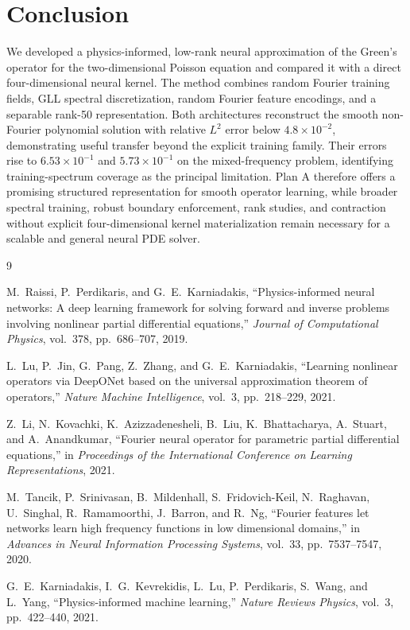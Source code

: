 \documentclass[11pt,a4paper]{article}
\begin{document}
\section{Conclusion}

We developed a physics-informed, low-rank neural approximation of the Green's operator for the two-dimensional Poisson equation and compared it with a direct four-dimensional neural kernel. The method combines random Fourier training fields, GLL spectral discretization, random Fourier feature encodings, and a separable rank-50 representation. Both architectures reconstruct the smooth non-Fourier polynomial solution with relative $L^2$ error below $4.8\times10^{-2}$, demonstrating useful transfer beyond the explicit training family. Their errors rise to $6.53\times10^{-1}$ and $5.73\times10^{-1}$ on the mixed-frequency problem, identifying training-spectrum coverage as the principal limitation. Plan A therefore offers a promising structured representation for smooth operator learning, while broader spectral training, robust boundary enforcement, rank studies, and contraction without explicit four-dimensional kernel materialization remain necessary for a scalable and general neural PDE solver.

\footnotesize
\begin{thebibliography}{9}

M.~Raissi, P.~Perdikaris, and G.~E.~Karniadakis,
``Physics-informed neural networks: A deep learning framework for solving forward and inverse problems involving nonlinear partial differential equations,''
\emph{Journal of Computational Physics}, vol.~378, pp.~686--707, 2019.

L.~Lu, P.~Jin, G.~Pang, Z.~Zhang, and G.~E.~Karniadakis,
``Learning nonlinear operators via DeepONet based on the universal approximation theorem of operators,''
\emph{Nature Machine Intelligence}, vol.~3, pp.~218--229, 2021.

Z.~Li, N.~Kovachki, K.~Azizzadenesheli, B.~Liu, K.~Bhattacharya, A.~Stuart, and A.~Anandkumar,
``Fourier neural operator for parametric partial differential equations,''
in \emph{Proceedings of the International Conference on Learning Representations}, 2021.

M.~Tancik, P.~Srinivasan, B.~Mildenhall, S.~Fridovich-Keil, N.~Raghavan, U.~Singhal, R.~Ramamoorthi, J.~Barron, and R.~Ng,
``Fourier features let networks learn high frequency functions in low dimensional domains,''
in \emph{Advances in Neural Information Processing Systems}, vol.~33, pp.~7537--7547, 2020.

G.~E.~Karniadakis, I.~G.~Kevrekidis, L.~Lu, P.~Perdikaris, S.~Wang, and L.~Yang,
``Physics-informed machine learning,''
\emph{Nature Reviews Physics}, vol.~3, pp.~422--440, 2021.

\end{thebibliography}
\end{document}
